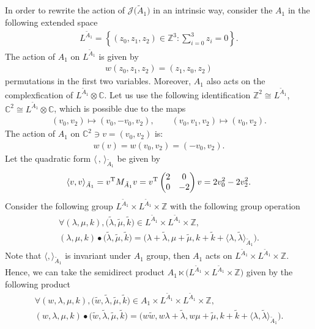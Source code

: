 \documentclass[10pt,a4paper]{amsart}
\numberwithin{equation}{section}
\newcommand{\Ja}{\mathcal{J}}
\begin{document}
In order to rewrite the action of $\Ja\big(\tilde A_1\big)$ in an intrinsic way, consider the $A_1$ in the following extended space
\begin{gather*}
L^{\tilde A_1}=\left\{(z_0,z_1,z_2)\in \mathbb{Z}^{3}\colon \sum _{i=0}^3z_i=0 \right\}.
\end{gather*}
The action of $A_1$ on $L^{\tilde A_1}$ is given by
\begin{gather*}
w(z_0,z_1,z_2)=(z_{1},z_{0},z_2)
\end{gather*}
permutations in the first two variables. Moreover, $A_1$ also acts on the complexfication of $L^{\tilde A_1}\otimes\mathbb{C}$. Let us use the following identification $\mathbb{Z}^{2}\cong L^{\tilde A_1}$, $\mathbb{C}^{2}\cong L^{\tilde A_1}\otimes \mathbb{C}$, which is possible due to the maps
\begin{gather*}
(v_{0},v_2)\mapsto (v_{0},-v_0,v_2),\qquad
(v_{0},v_1,v_2)\mapsto (v_{0},v_2).
\end{gather*}
The action of $A_1$ on $\mathbb{C}^2 \ni v=(v_0,v_2)$ is:
\begin{gather*}
w(v)=w(v_0,v_2)=(-v_{0},v_2).
\end{gather*}
Let the quadratic form $\langle\,,\,\rangle_{\tilde A_1}$ be given by
\begin{gather}\label{invariant metric A1 t}
\langle v,v\rangle_{\tilde A_1}=v^{\rm T}M_{\tilde A_1}v
=v^{\rm T} \begin{pmatrix}2 & 0 \\0 & -2\\ \end{pmatrix}v=2v_0^2-2v_2^2.
\end{gather}
Consider the following group $L^{\tilde A_1}\times L^{\tilde A_1}\times \mathbb{Z}$ with the following group operation
\begin{gather*}
\forall (\lambda,\mu,k), \big(\tilde\lambda,\tilde\mu,\tilde k\big) \in L^{\tilde A_1}\times L^{\tilde A_1}\times \mathbb{Z},
\\
(\lambda,\mu,k)\bullet\big(\tilde\lambda,\tilde\mu,\tilde k\big)=\big(\lambda+\tilde\lambda,\mu+\tilde\mu,k+\tilde k+\langle \lambda,\tilde\lambda\rangle_{\tilde A_1}\big).
\end{gather*}
Note that $\langle ,\rangle_{\tilde A_1}$ is invariant under $A_1$ group, then $A_1$ acts on $L^{\tilde A_1}\times L^{\tilde A_1}\times \mathbb{Z}$. Hence, we can take the semidirect product $A_1\ltimes \big(L^{\tilde A_1}\times L^{\tilde A_1}\times \mathbb{Z}\big) $ given by the following product
\begin{gather*}
\forall (w,\lambda,\mu,k), \big(\tilde w,\tilde\lambda,\tilde\mu,\tilde k\big) \in A_1\times L^{\tilde A_1}\times L^{\tilde A_1}\times \mathbb{Z},
\\
(w,\lambda,\mu,k)\bullet\big(\tilde w,\tilde\lambda,\tilde\mu,\tilde k\big)=\big(w\tilde w,w\lambda+\tilde\lambda,w\mu+\tilde\mu,k+\tilde k+\langle\lambda,\tilde\lambda\rangle_{\tilde A_1}\big).
\end{gather*}
\end{document}
